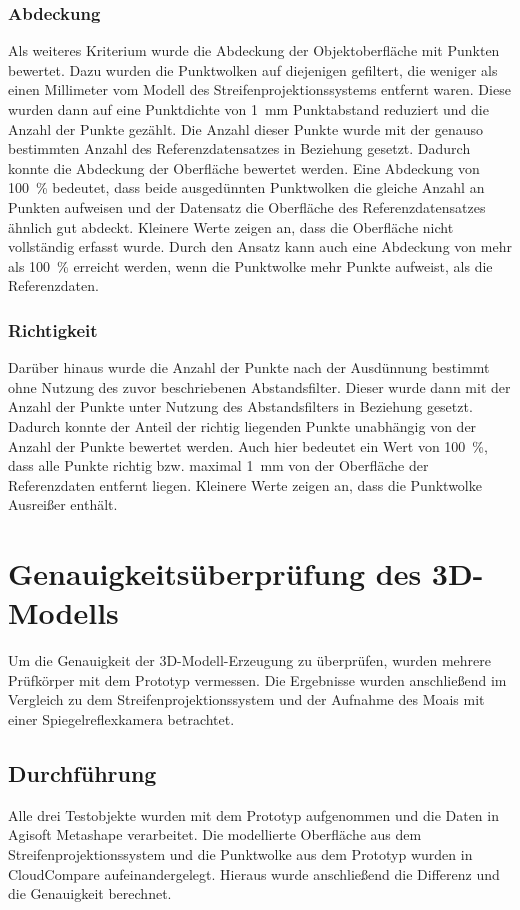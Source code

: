 \documentclass[./00PhotoBox.tex]{subfiles}
\begin{document}
\subsubsection{Abdeckung}
\label{ss:abdeckung}
Als weiteres Kriterium wurde die Abdeckung der Objektoberfläche mit Punkten bewertet. Dazu wurden die Punktwolken auf diejenigen gefiltert, die weniger als einen Millimeter vom Modell des Streifenprojektionssystems entfernt waren. Diese wurden dann auf eine Punktdichte von \SI{1}{\milli\metre} Punktabstand reduziert und die Anzahl der Punkte gezählt. Die Anzahl dieser Punkte wurde mit der genauso bestimmten Anzahl des Referenzdatensatzes in Beziehung gesetzt. Dadurch konnte die Abdeckung der Oberfläche bewertet werden. Eine Abdeckung von \SI{100}{\percent} bedeutet, dass beide ausgedünnten Punktwolken die gleiche Anzahl an Punkten aufweisen und der Datensatz die Oberfläche des Referenzdatensatzes ähnlich gut abdeckt. Kleinere Werte zeigen an, dass die Oberfläche nicht vollständig erfasst wurde. Durch den Ansatz kann auch eine Abdeckung von mehr als \SI{100}{\percent} erreicht werden, wenn die Punktwolke mehr Punkte aufweist, als die Referenzdaten.

\subsubsection{Richtigkeit}
Darüber hinaus wurde die Anzahl der Punkte nach der Ausdünnung bestimmt ohne Nutzung des zuvor beschriebenen Abstandsfilter. Dieser wurde dann mit der Anzahl der Punkte unter Nutzung des Abstandsfilters in Beziehung gesetzt. Dadurch konnte der Anteil der richtig liegenden Punkte unabhängig von der Anzahl der Punkte bewertet werden. Auch hier bedeutet ein Wert von \SI{100}{\percent}, dass alle Punkte richtig bzw. maximal \SI{1}{\milli\metre} von der Oberfläche der Referenzdaten entfernt liegen. Kleinere Werte zeigen an, dass die Punktwolke Ausreißer enthält.




\section{Genauigkeitsüberprüfung des 3D-Modells}
\label{s:genauigkeitsueberpruefung}
Um die Genauigkeit der 3D-Modell-Erzeugung zu überprüfen, wurden mehrere Prüf\-körper mit dem Prototyp vermessen. Die Ergebnisse wurden anschließend im Vergleich zu dem Streifenprojektionssystem und der Aufnahme des Moais mit einer Spiegelreflexkamera betrachtet.

\subsection{Durchführung}
Alle drei Testobjekte wurden mit dem Prototyp aufgenommen und die Daten in Agisoft Metashape verarbeitet. Die modellierte Oberfläche aus dem Streifenprojektionssystem und die Punktwolke aus dem Prototyp wurden in CloudCompare aufeinandergelegt. Hieraus wurde anschließend die Differenz und die Genauigkeit berechnet.
\end{document}
